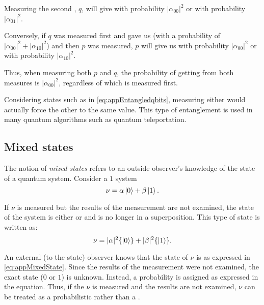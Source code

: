 Measuring the second \qbit{}, $q$, will give  with 
probability $|\alpha_{00}|^2$ or  
with probability $|\alpha_{01}|^2$. 

Conversely, if  $q$ was measured first and gave us   
(with a probability of $|\alpha_{00}|^2 + |\alpha_{10}|^2$)
and then $p$ was measured, $p$ will give us  with probability 
$|\alpha_{00}|^2$ or  with probability $|\alpha_{10}|^2$.

Thus, when measuring both $p$ and $q$, the probability of getting  
from both measures is $|\alpha_{00}|^2$, regardless of which \qbit{}
is measured first.

Considering states such as in \ref{eq:appEntangledqbits}, 
measuring either \qbit{} would actually force the other \qbit{} to the
same value. This type of entanglement is used in 
many quantum algorithms such as 
quantum teleportation.
\subsection{Mixed states}\label{sec:appMixedStates}
The notion of \emph{mixed states} refers to an outside observer's knowledge of
the state of a quantum system. Consider a $1$ \qbit{} system
\begin{equation}
\nu = \alpha\left\vert{0}\right\rangle + \beta\left\vert{1}\right\rangle.\label{eq:appOneQbitSystem}
\end{equation}

If $\nu$ is measured but the results of the measurement are not examined,
 the state of the system is either  or 
 and is no longer in a superposition. This type of state
is written as:
\begin{equation}
\nu = |\alpha|^2\{\left\vert{0}\right\rangle\} + |\beta|^2\{\left\vert{1}\right\rangle\}.\label{eq:appMixedState}
\end{equation}

An external (to the state) observer knows that the state 
of $\nu$ is as expressed in
\vref{eq:appMixedState}. Since the results of the measurement
were not examined, the exact state ($0$ or $1$) is unknown. 
Instead, a probability is assigned  as expressed in the equation. 
Thus, if the \qbit{} $\nu$ is measured and the results are not
examined, $\nu$ can be treated as a probabilistic \bit{} rather
than a  \qbit.
